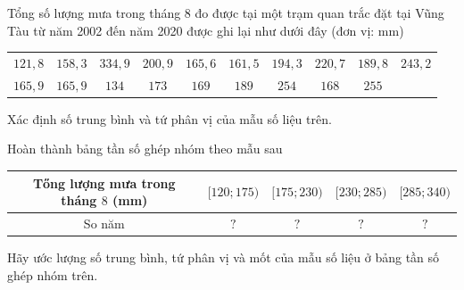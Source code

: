 \begin{ex}%
	Tổng số lượng mưa trong tháng 8 đo được tại một trạm quan trắc đặt tại Vũng Tàu từ năm 2002 đến năm 2020 được ghi  lại như dưới đây (đơn vị: mm)
	\begin{center}
		\begin{tabular}{cccccccccc}
			$121{,}8$ &  $158{,}3$ & $334{,}9$ & $200{,}9$ & $165{,}6$ & $161{,}5$ & $194{,}3$ & $220{,}7$ & $189{,}8$ & $243{,}2$ \\
			$165{,}9$ & $165{,}9$ & $134$ &  $173$ & $169$ & $189$ & $254$ & $168$ & $255$ &
		\end{tabular}
	\end{center}
	\begin{listEX}
		\item  Xác định số trung bình và tứ phân vị của mẫu số liệu trên.
		\item Hoàn thành bảng tần số  ghép nhóm theo mẫu sau
		\begin{center}
			\begin{tabular}{|c|c|c|c|c|}
				\hline Tőng lượng mưa trong tháng $8$ (mm) & $[120;175)$  & $[175;230)$ & $[230;285)$ & $[285;340)$ \\
				\hline So  năm & $?$ & $?$ & $?$ & $?$ \\
				 \hline
			\end{tabular}
		\end{center}
		\item Hãy ước  lượng số trung bình, tứ phân vị và mốt của mẫu số liệu ở bảng tần số ghép nhóm trên.
	\end{listEX}
\end{ex}
